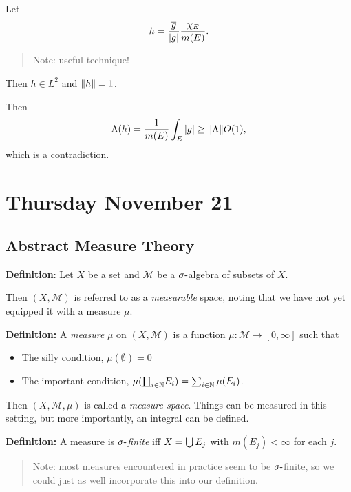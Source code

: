 Let
\begin{align*}
h = \frac{\overline{g}}{{\left\lvert {g} \right\rvert}} \frac{\chi_E}{m(E)}
.\end{align*}

\begin{quote}
Note: useful technique!
\end{quote}

Then \(h\in L^2\) and \({\left\lVert {h} \right\rVert} = 1\).

Then
\begin{align*}
\Lambda(h) = \frac{1}{m(E)} \int_E {\left\lvert {g} \right\rvert} \geq {\left\lVert {\Lambda} \right\rVert} O(1)
,\end{align*} which is a contradiction.

\hypertarget{thursday-november-21}{%
\section{Thursday November 21}\label{thursday-november-21}}

\hypertarget{abstract-measure-theory}{%
\subsection{Abstract Measure Theory}\label{abstract-measure-theory}}

\textbf{Definition}: Let \(X\) be a set and \(\mathcal M\) be a
\(\sigma{\hbox{-}}\)algebra of subsets of \(X\).

Then \((X, \mathcal M)\) is referred to as a \emph{measurable} space,
noting that we have not yet equipped it with a measure \(\mu\).

\textbf{Definition:} A \emph{measure} \(\mu\) on \((X, \mathcal M)\) is
a function \(\mu: \mathcal M \to [0, \infty]\) such that

\begin{itemize}
\item
  The silly condition, \(\mu(\emptyset) = 0\)
\item
  The important condition,
  \(\mu({\coprod}_{i\in {\mathbb{N}}} E_i) = \sum_{i\in{\mathbb{N}}} \mu(E_i)\).
\end{itemize}

Then \((X, \mathcal M, \mu)\) is called a \emph{measure space}. Things
can be measured in this setting, but more importantly, an integral can
be defined.

\textbf{Definition:} A measure is \emph{\(\sigma{\hbox{-}}\)finite} iff
\(X = \bigcup E_j\) with \(m(E_j) < \infty\) for each \(j\).

\begin{quote}
Note: most measures encountered in practice seem to be
\(\sigma{\hbox{-}}\)finite, so we could just as well incorporate this into
our definition.
\end{quote}

